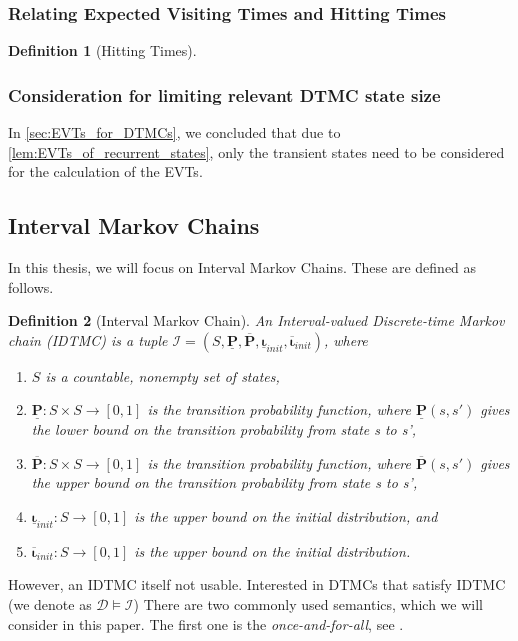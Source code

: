 \documentclass[journal,compsoc,10pt]{IEEEtran}
\newcommand{\MC}{\mathcal{D}} %
\newcommand{\IMC}{\mathcal{I}} %
\newcommand{\PFupper}{\mathbf{\overline{P}}}
\newcommand{\PFlower}{\mathbf{\underline{P}}}
\newcommand{\Initupper}{\mathbf{\overline{\iota}}_{init}}
\newcommand{\Initlower}{\mathbf{\underline{\iota}}_{init}}
\newtheorem{definition}{Definition}[section]
\begin{document}
\subsubsection{Relating Expected Visiting Times and Hitting Times}
\begin{definition}[Hitting Times]
    
\end{definition}

\subsubsection{Consideration for limiting relevant DTMC state size}
In \cref{sec:EVTs_for_DTMCs}, we concluded that due to \cref{lem:EVTs_of_recurrent_states}, only the transient states need to be considered for the calculation of the EVTs.

\subsection{Interval Markov Chains}\label{sec:IMCs}  
In this thesis, we will focus on Interval Markov Chains. These are defined as follows.
\begin{definition}[Interval Markov Chain]\label{def:IMC}
    An Interval-valued Discrete-time Markov chain (IDTMC) is a tuple $\IMC=(S,\PFlower,\PFupper,\Initlower,\Initupper)$, where
    \begin{enumerate}[label=(\roman*)]
        \item $S$ is a countable, nonempty set of states,
        \item $\PFlower: S \times S \rightarrow [0,1]$ is the transition probability function, where $\PFlower(s,s')$ gives the lower bound on the transition probability from state s to s',
        \item $\PFupper: S \times S \rightarrow [0,1]$ is the transition probability function, where $\PFupper(s,s')$ gives the upper bound on the transition probability from state s to s',
        \item $\Initlower: S \rightarrow [0,1]$ is the upper bound on the initial distribution, and
        \item $\Initupper: S \rightarrow [0,1]$ is the upper bound on the initial distribution.
    \end{enumerate}
\end{definition}

However, an IDTMC itself not usable. Interested in DTMCs that satisfy IDTMC (we denote as $\MC \models \IMC$)
There are two commonly used semantics, which we will consider in this paper. The first one is the \textit{once-and-for-all}, see \cite{Semantics_Quant-Analysis,Semantics_Model-Checking_omega-Regular,Semantics_LTL_Model_Checking}. 
\end{document}
